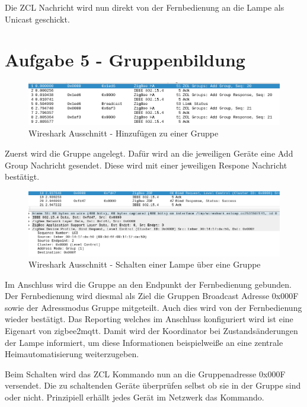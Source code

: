 Die ZCL Nachricht wird nun direkt von der Fernbedienung an die Lampe als Unicast geschickt.

\section{Aufgabe 5 - Gruppenbildung}

\begin{figure}[H]
    \centering
    \includegraphics[width=1\textwidth]{media/lsg-5-1.png}
    \caption{Wireshark Ausschnitt - Hinzufügen zu einer Gruppe}
\end{figure}

Zuerst wird die Gruppe angelegt. Dafür wird an die jeweiligen Geräte eine Add Group Nachricht gesendet. Diese wird mit einer jeweiligen Respone
Nachricht bestätigt.

\begin{figure}[H]
    \centering
    \includegraphics[width=1\textwidth]{media/lsg-5-2.png}
    \caption{Wireshark Ausschnitt - Schalten einer Lampe über eine Gruppe}
\end{figure}

Im Anschluss wird die Gruppe an den Endpunkt der Fernbedienung gebunden. Der Fernbedienung wird diesmal als Ziel die Gruppen Broadcast Adresse
0x000F sowie der Adressmodus Gruppe mitgeteilt. Auch dies wird von der Fernbedienung wieder bestätigt. Das Reporting welches im Anschluss 
konfiguriert wird ist eine Eigenart von zigbee2mqtt. Damit wird der Koordinator bei Zustandsänderungen der Lampe informiert, um diese Informationen
beispielweiße an eine zentrale Heimautomatisierung weiterzugeben.

Beim Schalten wird das ZCL Kommando nun an die Gruppenadresse 0x000F versendet. Die zu schaltenden Geräte überprüfen selbst ob sie in der Gruppe sind 
oder nicht. Prinzipiell erhällt jedes Gerät im Netzwerk das Kommando.







